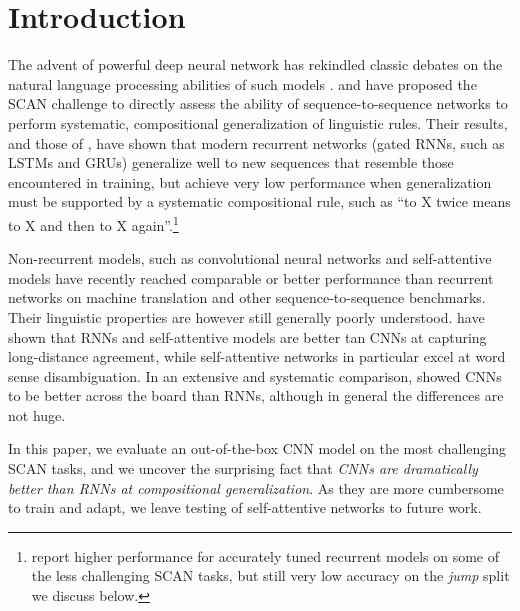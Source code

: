 \section{Introduction}
\label{sec:intro}

The advent of powerful deep neural network has rekindled classic
debates on the natural language processing abilities of such models
\cite[e.g.,][]{Kirov:Cotterell:2018,Linzen:etal:2018,McCoy:etal:2018,Pater:2018}. \citet{Lake:Baroni:2017}
and \citet{Loula:etal:2018} have proposed the SCAN challenge to
directly assess the ability of sequence-to-sequence networks to
perform systematic, compositional generalization of linguistic
rules. Their results, and those of \citet{Bastings:etal:2018}, have
shown that modern recurrent networks (gated RNNs, such as LSTMs and GRUs) generalize well
to new sequences that resemble those encountered in training,
but achieve very low performance when generalization must be
supported by a systematic compositional rule, such as ``to X twice
means to X and then to X again''.\footnote{\citet{Bastings:etal:2018}
  report higher performance for accurately tuned recurrent models on
  some of the less challenging SCAN tasks, but still very low accuracy on the \emph{jump} split we discuss below.}

Non-recurrent models, such as convolutional neural networks
\cite[CNNs,][]{kalchbrenner:etal:2016, gehring:etal:2016,
  gehring:etal:2017} and self-attentive models
\cite{vaswani:etal:2017, chen:etal:2018} have recently reached
comparable or better performance than recurrent networks on machine
translation and other sequence-to-sequence benchmarks. Their
linguistic properties are however  still generally poorly
understood.  have shown that RNNs and
self-attentive models are better tan CNNs at capturing long-distance
agreement, while self-attentive networks in particular excel at
word sense disambiguation. In an extensive and systematic comparison,
 showed CNNs to be better across the board
than RNNs, although in general the differences are not huge.

In this paper, we evaluate an out-of-the-box CNN model on the most
challenging SCAN tasks, and we uncover the surprising fact that
\emph{CNNs are dramatically better than RNNs at compositional
  generalization}. As they are more cumbersome to
train and adapt, we leave testing of self-attentive networks to future
work.


